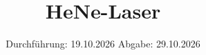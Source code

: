 

\subject{VERSUCH NUMMER 61}
\title{HeNe-Laser}
\date{%
  Durchführung: 19.10.2026
  \hspace{3em}
  Abgabe: 29.10.2026
}



\maketitle
\thispagestyle{empty}
\tableofcontents
\newpage
\setcounter{page}{1}



%




\printbibliography{}


